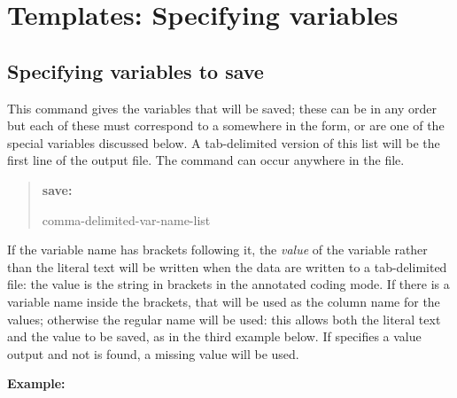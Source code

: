 \documentclass[letterpaper,10pt,english]{sphinxmanual}
\begin{document}
\section{Templates: Specifying variables}
\label{forms:templates-specifying-variables}

\subsection{Specifying variables to save}
\label{forms:specifying-variables-to-save}
This command gives the variables that will be saved; these can be in any
order but each of these must correspond to a  somewhere in
the form, or are one of the special variables discussed below. A
tab-delimited version of this list will be the first line of the output
file. The command can occur anywhere in the file.
\begin{quote}

\begin{DUlineblock}{0em}
\item[] \textbf{save:}
\item[] comma-delimited-var-name-list
\end{DUlineblock}
\end{quote}

If the variable name has brackets following it, the \emph{value} of the
variable rather than the literal text will be written when the data are
written to a tab-delimited file: the value is the string in brackets
\code{{[}…{]}} in the annotated coding mode. If there is a variable name inside
the brackets, that will be used as the column name for the values;
otherwise the regular name will be used: this allows both the literal
text and the value to be saved, as in the third example below. If
 specifies a value output and not is found, a missing value will
be used.

\textbf{Example:}
\begin{quote}

\begin{DUlineblock}{0em}
\item[] 
\item[] 
\item[] 
\end{DUlineblock}
\end{quote}
\end{document}
